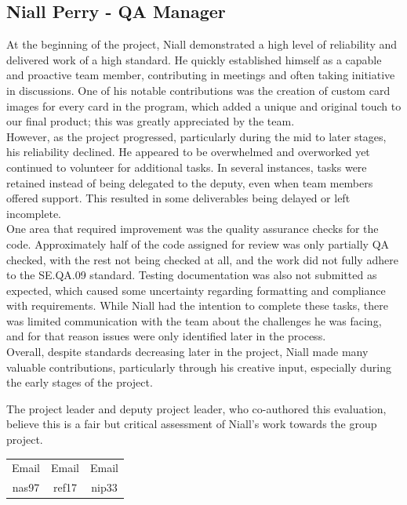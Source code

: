 \documentclass[a4paper]{project}
\begin{document}
		\subsection{Niall Perry - QA Manager}\label{subsec:performance-niall-perry}
		
			At the beginning of the project, Niall demonstrated a high level of reliability and delivered work of a high standard. He quickly established himself as a capable and proactive team member, contributing in meetings and often taking initiative in discussions. One of his notable contributions was the creation of custom card images for every card in the program, which added a unique and original touch to our final product; this was greatly appreciated by the team. \\
			However, as the project progressed, particularly during the mid to later stages, his reliability declined. He appeared to be overwhelmed and overworked yet continued to volunteer for additional tasks. In several instances, tasks were retained instead of being delegated to the deputy, even when team members offered support. This resulted in some deliverables being delayed or left incomplete. \\
			One area that required improvement was the quality assurance checks for the code. Approximately half of the code assigned for review was only partially QA checked, with the rest not being checked at all, and the work did not fully adhere to the SE.QA.09 standard. Testing documentation was also not submitted as expected, which caused some uncertainty regarding formatting and compliance with requirements. While Niall had the intention to complete these tasks, there was limited communication with the team about the challenges he was facing, and for that reason issues were only identified later in the process. \\
			Overall, despite standards decreasing later in the project, Niall made many valuable contributions, particularly through his creative input, especially during the early stages of the project.
			
			The project leader and deputy project leader, who co-authored this evaluation, believe this is a fair but critical assessment of Niall's work towards the group project.
			
			\begin{center}
				\setlength{\tabcolsep}{0.05\paperwidth}
				\begin{tabular}{c c c}
					Email & Email & Email  \\
					nas97 & ref17 & nip33
				\end{tabular}
			\end{center}
			
\end{document}
